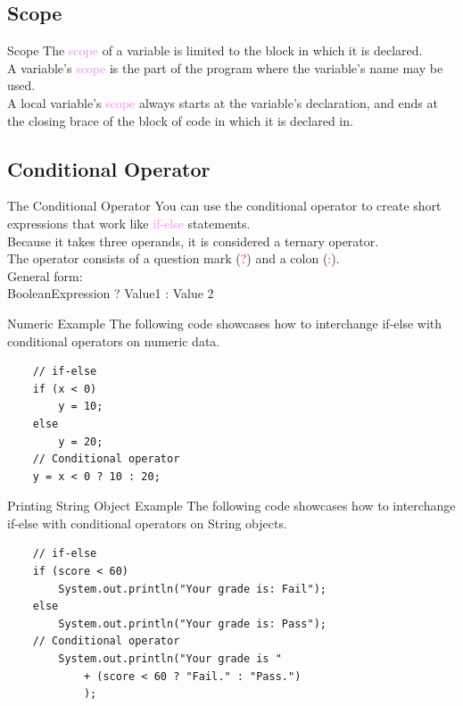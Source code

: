 \documentclass[11pt]{beamer}
\newcommand{\red}[1]{\textcolor{red}{#1}}
\newcommand{\violet}[1]{\textcolor{violet}{#1}}
\begin{document}
\subsection{Scope}
    
\begin{frame}{Scope}
    The \violet{scope} of a variable is limited to the block in which it is declared. \\
    \vspace{1em}
    A variable's \violet{scope} is the part of the program where the variable's name may be used. \\
    \vspace{1em}
    A local variable's \violet{scope} always starts at the variable's declaration, and ends at the closing brace of the block of code in which it is declared in.
\end{frame}

\subsection{Conditional Operator}
\begin{frame}{The Conditional Operator}
    You can use the conditional operator to create short expressions that work like \violet{if-else} statements. \\
    \vspace{1em}
    Because it takes three operands, it is considered a ternary operator. \\
    \vspace{1em}
    The operator consists of a question mark (\red{?}) and a colon (\red{:}). \\
    \vspace{1em}
    General form: \\
    BooleanExpression ? Value1 : Value 2
\end{frame}

\begin{frame}[fragile]{Numeric Example}
    The following code showcases how to interchange if-else with conditional operators on numeric data.
    \begin{lstlisting}
    // if-else
    if (x < 0)
        y = 10;
    else
        y = 20;
    // Conditional operator
    y = x < 0 ? 10 : 20;
    \end{lstlisting}
\end{frame}

\begin{frame}[fragile]{Printing String Object Example}
    The following code showcases how to interchange if-else with conditional operators on String objects.
    \begin{lstlisting}
    // if-else
    if (score < 60)
        System.out.println("Your grade is: Fail");
    else
        System.out.println("Your grade is: Pass");
    // Conditional operator
        System.out.println("Your grade is " 
            + (score < 60 ? "Fail." : "Pass.")
            );
    \end{lstlisting}
\end{frame}
\end{document}
